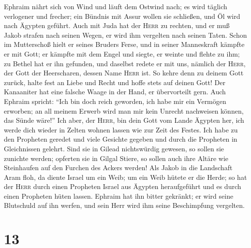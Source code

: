  Ephraim nährt sich von Wind und läuft dem Ostwind nach;
es wird täglich verlogener und frecher; ein Bündnis mit Assur wollen sie
schließen, und Öl wird nach Ägypten geführt.  Auch mit
Juda hat der \textsc{Herr} zu rechten, und er muß Jakob strafen nach
seinen Wegen, er wird ihm vergelten nach seinen Taten. 
Schon im Mutterschoß hielt er seines Bruders Ferse, und in seiner
Manneskraft kämpfte er mit Gott;  er kämpfte mit dem Engel
und siegte, er weinte und flehte zu ihm; zu Bethel hat er ihn gefunden,
und daselbst redete er mit uns,  nämlich der
\textsc{Herr}, der Gott der Heerscharen, dessen Name \textsc{Herr} ist.
 So kehre denn zu deinem Gott zurück, halte fest an Liebe
und Recht und hoffe stets auf deinen Gott!  Der Kanaaniter
hat eine falsche Waage in der Hand, er übervorteilt gern. 
Auch Ephraim spricht: ``Ich bin doch reich geworden, ich habe mir ein
Vermögen erworben; an all meinem Erwerb wird man mir kein Unrecht
nachweisen können, das Sünde wäre!''  Ich aber, der
\textsc{Herr}, bin dein Gott vom Lande Ägypten her, ich werde dich
wieder in Zelten wohnen lassen wie zur Zeit des Festes. 
Ich habe zu den Propheten geredet und viele Gesichte gegeben und durch
die Propheten in Gleichnissen gelehrt.  Sind sie in
Gilead nichtswürdig gewesen, so sollen sie zunichte werden; opferten sie
in Gilgal Stiere, so sollen auch ihre Altäre wie Steinhaufen auf den
Furchen des Ackers werden!  Als Jakob in die Landschaft
Aram floh, da diente Israel um ein Weib; um ein Weib hütete er die
Herde;  so hat der \textsc{Herr} durch einen Propheten
Israel aus Ägypten heraufgeführt und es durch einen Propheten hüten
lassen.  Ephraim hat ihn bitter gekränkt; er wird seine
Blutschuld auf ihn werfen, und sein Herr wird ihm seine Beschimpfung
vergelten.

\hypertarget{section-12}{%
\section{13}\label{section-12}}

